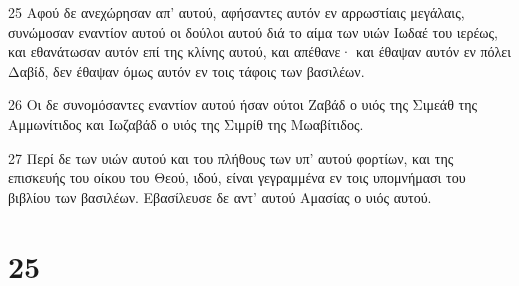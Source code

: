 \par 25 Αφού δε ανεχώρησαν απ' αυτού, αφήσαντες αυτόν εν αρρωστίαις μεγάλαις, συνώμοσαν εναντίον αυτού οι δούλοι αυτού διά το αίμα των υιών Ιωδαέ του ιερέως, και εθανάτωσαν αυτόν επί της κλίνης αυτού, και απέθανε· και έθαψαν αυτόν εν πόλει Δαβίδ, δεν έθαψαν όμως αυτόν εν τοις τάφοις των βασιλέων.
\par 26 Οι δε συνομόσαντες εναντίον αυτού ήσαν ούτοι Ζαβάδ ο υιός της Σιμεάθ της Αμμωνίτιδος και Ιωζαβάδ ο υιός της Σιμρίθ της Μωαβίτιδος.
\par 27 Περί δε των υιών αυτού και του πλήθους των υπ' αυτού φορτίων, και της επισκευής του οίκου του Θεού, ιδού, είναι γεγραμμένα εν τοις υπομνήμασι του βιβλίου των βασιλέων. Εβασίλευσε δε αντ' αυτού Αμασίας ο υιός αυτού.

\chapter{25}

